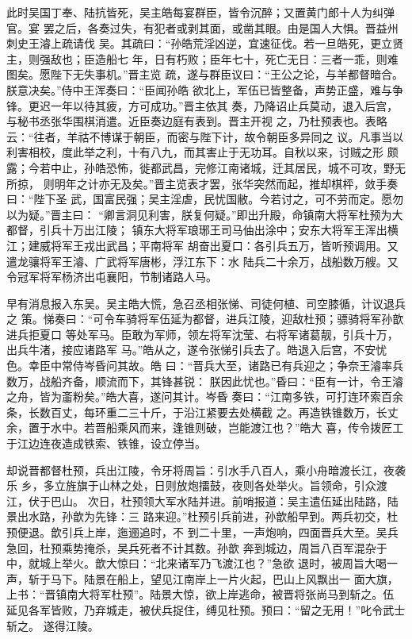 此时吴国丁奉、陆抗皆死，吴主皓每宴群臣，皆令沉醉；又置黄门郎十人为纠弹官。宴
罢之后，各奏过失，有犯者或剥其面，或凿其眼。由是国人大惧。晋益州刺史王濬上疏请伐
吴。其疏曰：“孙皓荒淫凶逆，宜速征伐。若一旦皓死，更立贤主，则强敌也；臣造船七
年，日有朽败；臣年七十，死亡无日：三者一乖，则难图矣。愿陛下无失事机。”晋主览
疏，遂与群臣议曰：“王公之论，与羊都督暗合。朕意决矣。”侍中王浑奏曰：“臣闻孙皓
欲北上，军伍已皆整备，声势正盛，难与争锋。更迟一年以待其疲，方可成功。”晋主依其
奏，乃降诏止兵莫动，退入后宫，与秘书丞张华围棋消遣。近臣奏边庭有表到。晋主开视
之，乃杜预表也。表略云：“往者，羊祜不博谋于朝臣，而密与陛下计，故令朝臣多异同之
议。凡事当以利害相校，度此举之利，十有八九，而其害止于无功耳。自秋以来，讨贼之形
颇露；今若中止，孙皓恐怖，徙都武昌，完修江南诸城，迁其居民，城不可攻，野无所掠，
则明年之计亦无及矣。”晋主览表才罢，张华突然而起，推却棋枰，敛手奏曰：“陛下圣
武，国富民强；吴主淫虐，民忧国敝。今若讨之，可不劳而定。愿勿以为疑。”晋主曰：
“卿言洞见利害，朕复何疑。”即出升殿，命镇南大将军杜预为大都督，引兵十万出江陵；
镇东大将军琅琊王司马伷出涂中；安东大将军王浑出横江；建威将军王戎出武昌；平南将军
胡奋出夏口：各引兵五万，皆听预调用。又遣龙骧将军王濬、广武将军唐彬，浮江东下：水
陆兵二十余万，战船数万艘。又令冠军将军杨济出屯襄阳，节制诸路人马。

早有消息报入东吴。吴主皓大慌，急召丞相张悌、司徒何植、司空膝循，计议退兵之
策。悌奏曰：“可令车骑将军伍延为都督，进兵江陵，迎敌杜预；骠骑将军孙歆进兵拒夏口
等处军马。臣敢为军师，领左将军沈莹、右将军诸葛靓，引兵十万，出兵牛渚，接应诸路军
马。”皓从之，遂令张悌引兵去了。皓退入后宫，不安忧色。幸臣中常侍岑昏问其故。皓
曰：“晋兵大至，诸路已有兵迎之；争奈王濬率兵数万，战船齐备，顺流而下，其锋甚锐：
朕因此忧也。”昏曰：“臣有一计，令王濬之舟，皆为齑粉矣。”皓大喜，遂问其计。岑昏
奏曰：“江南多铁，可打连环索百余条，长数百丈，每环重二三十斤，于沿江紧要去处横截
之。再造铁锥数万，长丈余，置于水中。若晋船乘风而来，逢锥则破，岂能渡江也？”皓大
喜，传令拨匠工于江边连夜造成铁索、铁锥，设立停当。

却说晋都督杜预，兵出江陵，令牙将周旨：引水手八百人，乘小舟暗渡长江，夜袭乐
乡，多立旌旗于山林之处，日则放炮擂鼓，夜则各处举火。旨领命，引众渡江，伏于巴山。
次日，杜预领大军水陆并进。前哨报道：吴主遣伍延出陆路，陆景出水路，孙歆为先锋：三
路来迎。”杜预引兵前进，孙歆船早到。两兵初交，杜预便退。歆引兵上岸，迤逦追时，不
到二十里，一声炮响，四面晋兵大至。吴兵急回，杜预乘势掩杀，吴兵死者不计其数。孙歆
奔到城边，周旨八百军混杂于中，就城上举火。歆大惊曰：“北来诸军乃飞渡江也？”急欲
退时，被周旨大喝一声，斩于马下。陆景在船上，望见江南岸上一片火起，巴山上风飘出一
面大旗，上书：“晋镇南大将军杜预”。陆景大惊，欲上岸逃命，被晋将张尚马到斩之。伍
延见各军皆败，乃弃城走，被伏兵捉住，缚见杜预。预曰：“留之无用！”叱令武士斩之。
遂得江陵。

